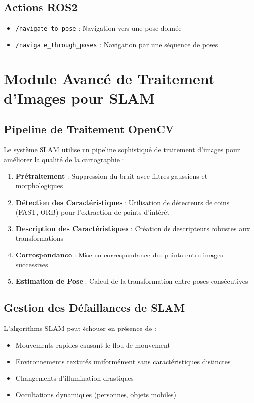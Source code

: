 \documentclass[12pt,a4paper,oneside]{report}
\begin{document}
\subsection{Actions ROS2}

\begin{itemize}
  \item \texttt{/navigate\_to\_pose} : Navigation vers une pose donnée
  \item \texttt{/navigate\_through\_poses} : Navigation par une séquence de poses
\end{itemize}

\section{Module Avancé de Traitement d'Images pour SLAM}

\subsection{Pipeline de Traitement OpenCV}

Le système SLAM utilise un pipeline sophistiqué de traitement d'images pour améliorer la qualité de la cartographie :

\begin{enumerate}
  \item \textbf{Prétraitement} : Suppression du bruit avec filtres gaussiens et morphologiques
  \item \textbf{Détection des Caractéristiques} : Utilisation de détecteurs de coins (FAST, ORB) pour l'extraction de points d'intérêt
  \item \textbf{Description des Caractéristiques} : Création de descripteurs robustes aux transformations
  \item \textbf{Correspondance} : Mise en correspondance des points entre images successives
  \item \textbf{Estimation de Pose} : Calcul de la transformation entre poses consécutives
\end{enumerate}

\subsection{Gestion des Défaillances de SLAM}

L'algorithme SLAM peut échouer en présence de :

\begin{itemize}
  \item Mouvements rapides causant le flou de mouvement
  \item Environnements texturés uniformément sans caractéristiques distinctes
  \item Changements d'illumination drastiques
  \item Occultations dynamiques (personnes, objets mobiles)
\end{itemize}
\end{document}
